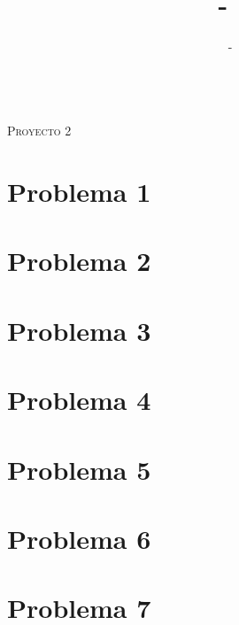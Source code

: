 \documentclass[letterpaper,12pt]{article}
\title{\Titulo\ -\ \Sigla\ \Ramo}
\author{\NombreI - \NombreII}
\newcommand{\Titulo}{Proyecto 2}
\numberwithin{equation}{section}
\begin{document}
\thispagestyle{empty}


\begin{center}
    \huge{\textsc{\Ramo\\ \Titulo}}
\end{center}

\vspace{1em}



\section{Problema 1}
\vspace{0.8em}
    
\clearpage

\section{Problema 2}
\vspace{0.8em}
    
\clearpage

\section{Problema 3}
\vspace{0.8em}
    
\clearpage

\section{Problema 4}
\vspace{0.8em}
    
\clearpage

\section{Problema 5}
\vspace{0.8em}
    
\clearpage

\section{Problema 6}
\vspace{0.8em}
    
\clearpage

\section{Problema 7}
\vspace{0.8em}
    
\clearpage
\end{document}
